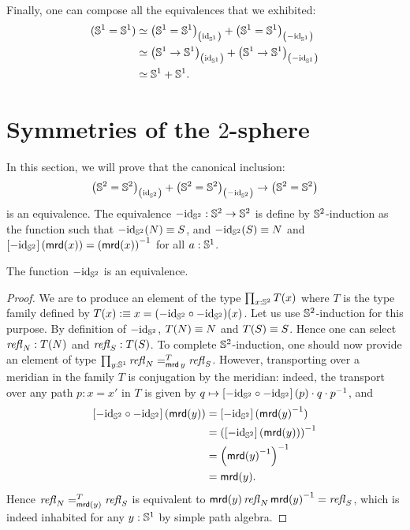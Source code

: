 \documentclass[english,a4]{article}
\renewcommand{\ap}[1]{\left[{#1}\right]}
\begin{document}
Finally, one can compose all the equivalences that we exhibited:
\begin{align*}
  ({{\mathbb S^{1}}}={{\mathbb S^{1}}})
  & \simeq {\left({{\mathbb S^{1}}}= {{\mathbb S^{1}}}\right)}_{\left(\mathord{\mathrm{id}}_{{\mathbb S^{1}}}\right)}
    + {\left({{\mathbb S^{1}}} = {{\mathbb S^{1}}}\right)}_{\left(-\mathord{\mathrm{id}}_{{\mathbb S^{1}}}\right)}
  \\
  & \simeq {\left({{\mathbb S^{1}}}\to {{\mathbb S^{1}}}\right)}_{\left(\mathord{\mathrm{id}}_{{\mathbb S^{1}}}\right)}
    + {\left({{\mathbb S^{1}}} \to {{\mathbb S^{1}}}\right)}_{\left(-\mathord{\mathrm{id}}_{{\mathbb S^{1}}}\right)}
  \\
  & \simeq {{\mathbb S^{1}}} + {{\mathbb S^{1}}}.
\end{align*}

\section{Symmetries of the $2$-sphere}
\label{sec:sphere}

In this section, we will prove that the canonical inclusion:
\begin{equation}
  \label{eq:goal-section-sphere}
  {\left({{\mathbb S^{2}}}= {{\mathbb S^{2}}}\right)}_{\left(\mathord{\mathrm{id}}_{{\mathbb S^{2}}}\right)} +
  {\left({{\mathbb S^{2}}} = {{\mathbb S^{2}}}\right)}_{\left(-\mathord{\mathrm{id}}_{{\mathbb S^{2}}}\right)}
  \to 
  \left({{\mathbb S^{2}}} = {{\mathbb S^{2}}}\right)
\end{equation}
is an equivalence. The equivalence $-\mathord{\mathrm{id}}_{{\mathbb S^{2}}} : {{\mathbb S^{2}}} \to {{\mathbb S^{2}}}$ is
define by ${{\mathbb S^{2}}}$-induction as the function such that
$-\mathord{\mathrm{id}}_{{\mathbb S^{2}}}(N) \equiv S$, and $-\mathord{\mathrm{id}}_{{\mathbb S^{2}}}(S) \equiv N$ and
$\ap{-\id_\Sp}(\mrd(x)) = \inv{(\mrd(x))}$ for all $a:{{\mathbb S^{1}}}$. 

\begin{lemma}
  The function $-\mathord{\mathrm{id}}_{{\mathbb S^{2}}}$ is an equivalence.
  \label{lem:minus-id-equivalence}
\end{lemma}
\begin{proof}
  We are to produce an element of the type $\prod_{x:{{\mathbb S^{2}}}}T(x)$ where $T$ is the
  type family defined by $T(x)\mathrel{\hbox{:}\mkern-5mu\equiv} x= (-\mathord{\mathrm{id}}_{{\mathbb S^{2}}} \circ -\mathord{\mathrm{id}}_{{\mathbb S^{2}}})(x)$. Let us
  use ${{\mathbb S^{2}}}$-induction for this purpose. By definition of $-\mathord{\mathrm{id}}_{{\mathbb S^{2}}}$, $T(N)
  \equiv N$ and $T(S) \equiv S$. Hence one can select $\mathop{{\mathit{refl}}_{N}}:T(N)$ and $\mathop{{\mathit{refl}}_{S}}:T(S)$. To complete ${{\mathbb S^{2}}}$-induction, one should now provide an element of
  type $\prod_{y:{{\mathbb S^{1}}}} \mathop{{\mathit{refl}}_{N}} =^{T}_{\operatorname{\mathsf{mrd}} y} \mathop{{\mathit{refl}}_{S}}$. However,
  transporting over a meridian in the family $T$ is conjugation by the
  meridian: indeed, the transport over any path $p:x=x'$ in $T$ is given by
  $q\mapsto \ap{-\id_\Sp \circ -\id_\Sp}(p) \cdot q \cdot \inv p$, and
  \begin{align*}
    \ap{-\id_\Sp \circ -\id_\Sp} (\mrd(y)) 
     &= \ap{-\id_\Sp}(\inv {\mrd(y)}) 
    \\ &= \inv {\left( \ap{-\id_\Sp}(\mrd(y)) \right)} 
    \\ &= \inv { \left( \inv{\mrd(y)} \right) }
    \\ &= \mrd(y).
  \end{align*}
  Hence $\mathop{{\mathit{refl}}_{N}} =^{T}_{\operatorname{\mathsf{mrd}}(y)} \mathop{{\mathit{refl}}_{S}}$ is equivalent to
  $\operatorname{\mathsf{mrd}}(y)\mathop{{\mathit{refl}}_{N}} {\operatorname{\mathsf{mrd}}(y)}^{-1} = \mathop{{\mathit{refl}}_{S}}$, which is indeed inhabited for any
  $y:{{\mathbb S^{1}}}$ by simple path algebra.
\end{proof}
\end{document}
